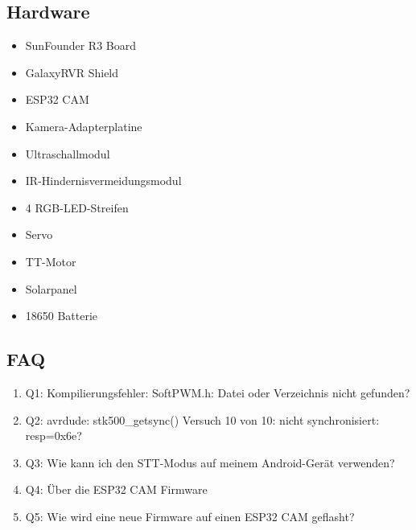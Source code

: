 \documentclass{vorlage-design-main}
\begin{document}
\hypertarget{hardware}{%
\subsection{Hardware}\label{hardware}}

\begin{itemize}

\item
  SunFounder R3 Board
\item
  GalaxyRVR Shield
\item
  ESP32 CAM
\item
  Kamera-Adapterplatine
\item
  Ultraschallmodul
\item
  IR-Hindernisvermeidungsmodul
\item
  4 RGB-LED-Streifen
\item
  Servo
\item
  TT-Motor
\item
  Solarpanel
\item
  18650 Batterie
\end{itemize}

\hypertarget{faq}{%
\subsection{FAQ}\label{faq}}

\begin{enumerate}
\def\labelenumi{\arabic{enumi}.}

\item
  Q1: Kompilierungsfehler: SoftPWM.h: Datei oder Verzeichnis nicht
  gefunden?
\item
  Q2: avrdude: stk500\_getsync() Versuch 10 von 10: nicht
  synchronisiert: resp=0x6e?
\item
  Q3: Wie kann ich den STT-Modus auf meinem Android-Gerät verwenden?
\item
  Q4: Über die ESP32 CAM Firmware
\item
  Q5: Wie wird eine neue Firmware auf einen ESP32 CAM geflasht?
\end{enumerate} %


\clearpage
\printbibliography
\end{document}
